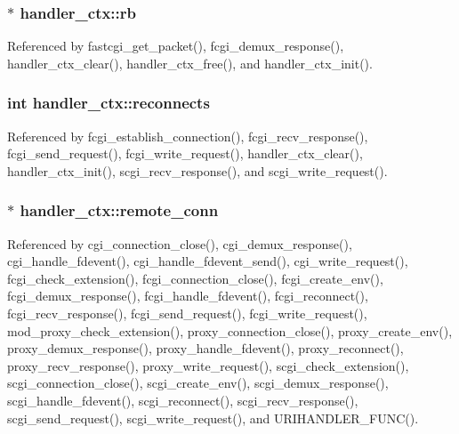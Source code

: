 \hypertarget{structhandler__ctx_a99152d50a505bc432273b3edfc6ffd92}{
\subsubsection[{rb}]{$\ast$ handler\-\_\-ctx\-::rb}}\label{structhandler__ctx_a99152d50a505bc432273b3edfc6ffd92}


Referenced by fastcgi\-\_\-get\-\_\-packet(), fcgi\-\_\-demux\-\_\-response(), handler\-\_\-ctx\-\_\-clear(), handler\-\_\-ctx\-\_\-free(), and handler\-\_\-ctx\-\_\-init().

\hypertarget{structhandler__ctx_aa8c753ade7eab6cca866898805b49773}{
\subsubsection[{reconnects}]{\setlength{\rightskip}{0pt plus 5cm}int handler\-\_\-ctx\-::reconnects}}\label{structhandler__ctx_aa8c753ade7eab6cca866898805b49773}


Referenced by fcgi\-\_\-establish\-\_\-connection(), fcgi\-\_\-recv\-\_\-response(), fcgi\-\_\-send\-\_\-request(), fcgi\-\_\-write\-\_\-request(), handler\-\_\-ctx\-\_\-clear(), handler\-\_\-ctx\-\_\-init(), scgi\-\_\-recv\-\_\-response(), and scgi\-\_\-write\-\_\-request().

\hypertarget{structhandler__ctx_a2ebe985a0115f4351cd85a6ba2aae8d5}{
\subsubsection[{remote\-\_\-conn}]{ $\ast$ handler\-\_\-ctx\-::remote\-\_\-conn}}\label{structhandler__ctx_a2ebe985a0115f4351cd85a6ba2aae8d5}


Referenced by cgi\-\_\-connection\-\_\-close(), cgi\-\_\-demux\-\_\-response(), cgi\-\_\-handle\-\_\-fdevent(), cgi\-\_\-handle\-\_\-fdevent\-\_\-send(), cgi\-\_\-write\-\_\-request(), fcgi\-\_\-check\-\_\-extension(), fcgi\-\_\-connection\-\_\-close(), fcgi\-\_\-create\-\_\-env(), fcgi\-\_\-demux\-\_\-response(), fcgi\-\_\-handle\-\_\-fdevent(), fcgi\-\_\-reconnect(), fcgi\-\_\-recv\-\_\-response(), fcgi\-\_\-send\-\_\-request(), fcgi\-\_\-write\-\_\-request(), mod\-\_\-proxy\-\_\-check\-\_\-extension(), proxy\-\_\-connection\-\_\-close(), proxy\-\_\-create\-\_\-env(), proxy\-\_\-demux\-\_\-response(), proxy\-\_\-handle\-\_\-fdevent(), proxy\-\_\-reconnect(), proxy\-\_\-recv\-\_\-response(), proxy\-\_\-write\-\_\-request(), scgi\-\_\-check\-\_\-extension(), scgi\-\_\-connection\-\_\-close(), scgi\-\_\-create\-\_\-env(), scgi\-\_\-demux\-\_\-response(), scgi\-\_\-handle\-\_\-fdevent(), scgi\-\_\-reconnect(), scgi\-\_\-recv\-\_\-response(), scgi\-\_\-send\-\_\-request(), scgi\-\_\-write\-\_\-request(), and U\-R\-I\-H\-A\-N\-D\-L\-E\-R\-\_\-\-F\-U\-N\-C().

